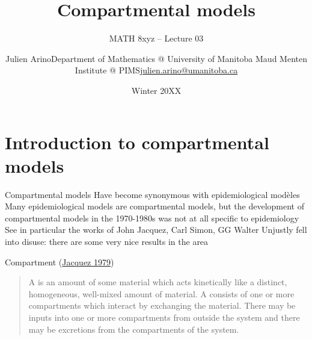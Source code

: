 \documentclass[aspectratio=169]{beamer}\usepackage[]{graphicx}\usepackage[]{xcolor}
\title{Compartmental models}
\subtitle{MATH 8xyz -- Lecture 03}
\author{\texorpdfstring{Julien Arino\newline Department of Mathematics @ University of Manitoba \newline Maud Menten Institute @ PIMS\newline\url{julien.arino@umanitoba.ca}}{Julien Arino}}
\date{Winter 20XX}
\begin{document}

\section{Introduction to compartmental models}


\begin{frame}{Compartmental models}
\bbullet Have become synonymous with epidemiological modèles
\vfill
\bbullet Many epidemiological models are compartmental models, but the development of compartmental models in the 1970-1980s was not at all specific to epidemiology
\vfill
\bbullet See in particular the works of John Jacquez, Carl Simon, GG Walter
\vfill
\bbullet Unjustly fell into disuse: there are some very nice results in the area    
\end{frame}

\begin{frame}{Compartment (\href{https://doi-org.uml.idm.oclc.org/10.1016/B978-0-12-434180-7.50021-8}{Jacquez 1979})}

\begin{quote}
  A  is an amount of some material which acts kinetically like a distinct, homogeneous, well-mixed amount of material. A  consists of one or more compartments which interact by exchanging the material. There may be inputs into one or more compartments from outside the system and there may be excretions from the compartments of the system.   
\end{quote}
\end{frame}
\end{document}
